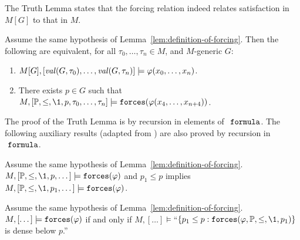 The Truth Lemma states that the forcing
relation indeed relates 
satisfaction in $M[G]$ to that in $M$. 
\begin{lemma}\label{lem:truth-lemma}
  Assume the same hypothesis of
  Lemma~\ref{lem:definition-of-forcing}. Then the
  following are equivalent, for all $\tau_0,\dots,\tau_n\in M$, and
  $M$-generic $G$: 
  \begin{enumerate}
  \item $M[G],[\operatorname{\mathit{val}}(G,\tau_0),\dots,\operatorname{\mathit{val}}(G,\tau_n)]
  \models\varphi(x_0,\dots,x_n)$.
  \item  There exists $p\in G$ such that $M,[\PP,\leq,\1,p,\tau_0,\dots,\tau_n] 
  \models\forceisa(\phi(x_4,\dots,x_{n+4}))$.
  \end{enumerate}
\end{lemma}
The proof of the Truth Lemma is by recursion in elements of
$\formula$. The following auxiliary results (adapted from
\cite[IV.2.43]{kunen2011set}) are also proved by recursion in
$\formula$.
\begin{lemma}[Strengthening]\label{lem:strengthen} 
  Assume the same hypothesis of Lemma~\ref{lem:definition-of-forcing}.
  $M, [\PP,\leq,\1,p,\dots]\models\forceisa(\phi)$ and $p_1\leq p$
  implies $M, [\PP,\leq,\1,p_1,\dots]\models\forceisa(\phi)$.
\end{lemma}
\begin{lemma}[Density]\label{lem:density}
  Assume the same hypothesis of
  Lemma~\ref{lem:definition-of-forcing}. $M,[\dots]\models\mathop{\mathtt{forces}}(\varphi)$ 
  if and only if 
  $M,[\dots]\models$``$\{p_1\leq p : \forceisa(\phi,\PP,\leq,\1,p_1)\}$ is
  dense below $p$.''
\end{lemma}

